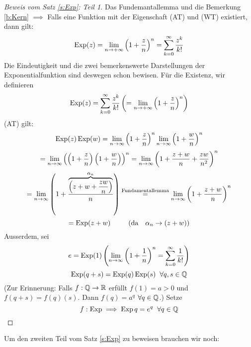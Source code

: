 \begin{proof}[Beweis vom Satz \ref{s:Exp}: Teil 1]
Das Fundemantallemma und die Bemerkung \ref{b:Kern}
$\implies$ Falls eine Funktion mit der Eigenschaft (AT) und (WT) existiert, dann gilt:
\[\operatorname{Exp}(z)=\lim_{n\to+\infty}\left( 1+\frac{z}{n} \right)^n=
\sum^\infty_{k=0}\frac{z^k}{k!}\]
Die Eindeutigkeit und die zwei bemerkenswerte Darstellungen der
Exponentialfunktion sind deswegen schon bewisen.
F\"ur die Existenz, wir definieren
  \[\operatorname{Exp}(z)=\sum^\infty_{k=0}\frac{z^k}{k!}\left( =\lim_{n\to+\infty}\left( 1+\frac{z}{n} \right)^n \right)\]
  (AT) gilt:
  \[\operatorname{Exp}(z)\operatorname{Exp}(w)=\displaystyle\lim_{n\rightarrow\infty}\left( 1+\frac{z}{n} \right)^n\displaystyle\lim_{n\rightarrow\infty}\left( 1+\frac{w}{n} \right)^n\]
  \[=\displaystyle\lim_{n\rightarrow\infty}\left( \left( 1+\frac{z}{n} \right)\left( 1+\frac{w}{n} \right) \right)^n=\displaystyle\lim_{n\rightarrow\infty}\left( 1+\frac{z+w}{n}+\frac{zw}{n^2} \right)^n\]
  \[=\displaystyle\lim_{n\rightarrow\infty}\left( 1+\frac{\overbrace{\left( z+w+\frac{zw}{n} \right)}^{\alpha_n}}{n} \right)\stackrel{\text{Fundamentallemma}}{=}\displaystyle\lim_{n\rightarrow\infty}\left( 1+\frac{z+w}{n} \right)^n\]
  \[=\operatorname{Exp}(z+w)\hspace{2mm}\qquad (\text{da}\quad \alpha_n\to(z+w))\]
Ausserdem, sei
  \[e=\operatorname{Exp}(1)\left( \displaystyle\lim_{n\rightarrow\infty}\left( 1+\frac{1}{n} \right)^n =\sum^\infty_{k=0}\frac{1}{k!}\right)\]
  \[\operatorname{Exp}(q+s)=\operatorname{Exp}(q)\operatorname{Exp}(s)\hspace{2mm}\forall q,s\in\mathbb{Q}\]
  (Zur Erinnerung: Falls $f:\mathbb{Q}\to\mathbb{R}$ erfüllt $f(1)=a>0$ und $f(q+s)=f(q)(s)$. Dann $f(q)=a^q$ $\forall q\in\mathbb{Q}$.) Setze
  \[f:\operatorname{Exp}\implies\operatorname{Exp}{q}=e^q\hspace{2mm}\forall q\in\mathbb{Q}\]
\end{proof}

Um den zweiten Teil vom Satz \ref{s:Exp} zu beweisen brauchen wir noch:

